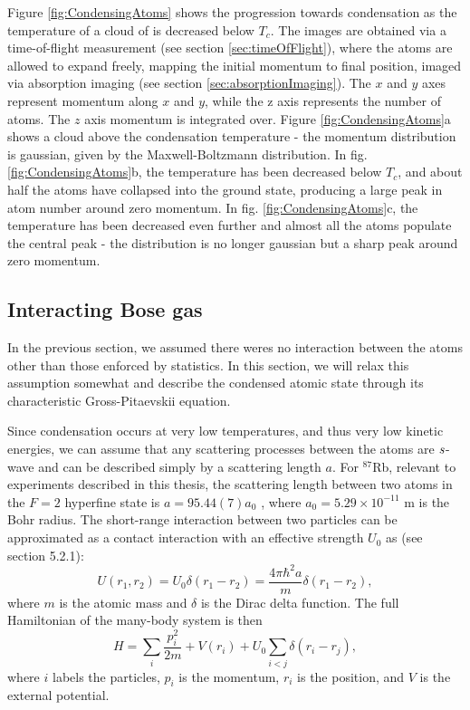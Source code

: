 Figure \ref{fig:CondensingAtoms} shows the progression towards condensation as the temperature of a cloud of \Rb{} is decreased below $T_c$. The images are obtained via a time-of-flight measurement (see section \ref{sec:timeOfFlight}), where the atoms are allowed to expand freely, mapping the initial momentum to final position, imaged via absorption imaging (see section \ref{sec:absorptionImaging}). The $x$ and $y$ axes represent momentum along $x$ and $y$, while the z axis represents the number of atoms. The $z$ axis momentum is integrated over.  Figure \ref{fig:CondensingAtoms}a shows a cloud above the condensation temperature - the momentum distribution is gaussian, given by the Maxwell-Boltzmann distribution. In  fig. \ref{fig:CondensingAtoms}b, the temperature has been decreased below $T_c$, and about half the atoms have collapsed into the ground state, producing a large peak in atom number around zero momentum. In  fig. \ref{fig:CondensingAtoms}c, the temperature has been decreased even further and almost all the atoms populate the central peak - the distribution is no longer gaussian but a sharp peak around zero momentum. 


\subsection{Interacting Bose gas}

In the previous section, we assumed there weres no interaction between the atoms other than those enforced by statistics. In this section, we will relax this assumption somewhat and describe the condensed atomic state through its characteristic Gross-Pitaevskii equation. 

Since condensation occurs at very low temperatures, and thus very low kinetic energies, we can assume that any scattering processes between the atoms are $\it{s}$-wave and can be described simply by a scattering length $a$. For $^{87}$Rb, relevant to experiments described in this thesis, the scattering length between two atoms in the $F=2$ hyperfine state is $a=95.44(7) a_0$ \cite{Egorov2013}, where $a_0=5.29\times10^{-11}$ m is the Bohr radius. The short-range interaction between two particles can be approximated as a contact interaction with an effective strength $U_0$ as (see \cite{Pethick} section 5.2.1):
\begin{equation}
U(r_1,r_2) = U_0 \delta(r_1-r_2) = \frac{4\pi\hbar^2 a}{m} \delta(r_1-r_2),
\end{equation}
where $m$ is the atomic mass and $\delta$ is the Dirac delta function. The full Hamiltonian of the many-body system is then
\begin{equation}
H=\sum_i \frac{p_i^2}{2m} + V(r_i) + U_0\sum_{i<j}\delta(r_i-r_j),
\end{equation}
where $i$ labels the particles, $p_i$ is the momentum, $r_i$ is the position, and $V$ is the external potential.

